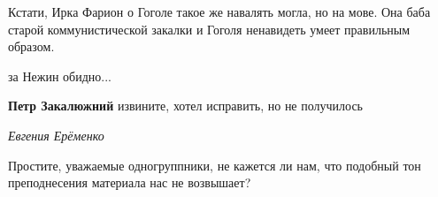 \begin{itemize}

Кстати, Ирка Фарион о Гоголе такое же навалять могла, но на мове. Она баба
старой коммунистической закалки и Гоголя ненавидеть умеет правильным образом.


за Нежин обидно...

\begin{itemize} %
\textbf{Петр Закалюжний} извините, хотел исправить, но не получилось
\end{itemize} %

\emph{Евгения Ерёменко}

Простите, уважаемые одногруппники, не кажется ли нам, что подобный тон
преподнесения материала нас не возвышает?


\end{itemize} %
